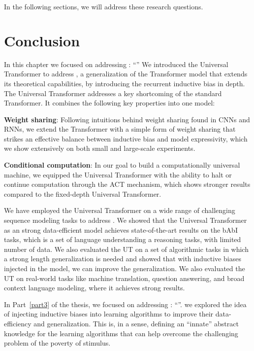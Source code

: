 In the following sections, we will address these research questions.




\section{Conclusion}
In this chapter we focused on addressing \textbf{}: ``\emph{}''
We introduced the Universal Transformer to address \textbf{}, a generalization of the Transformer model that extends its theoretical capabilities, by introducing the recurrent inductive bias in depth. 
The Universal Transformer addresses a key shortcoming of the standard Transformer. It combines the following key properties into one model:

\textbf{Weight sharing}: Following intuitions behind weight sharing found in CNNs and RNNs, we extend the Transformer with a simple form of weight sharing that strikes an effective balance between inductive bias and model expressivity, which we show extensively on both small and large-scale experiments.

\textbf{Conditional computation}: In our goal to build a computationally universal machine, we equipped the Universal Transformer with the ability to halt or continue computation through the ACT mechanism, which shows stronger results compared to the fixed-depth Universal Transformer.

We have employed the Universal Transformer on a wide range of challenging sequence modeling tasks to address \textbf{}. 
We showed that the Universal Transformer as an strong data-efficient model achieves state-of-the-art results on the bAbI tasks, which is a set of language understanding a reasoning tasks,  with limited number of data. We also evaluated the UT on a set of algorithmic tasks in which a strong length generalization is needed and showed that with inductive biases injected in the model, we can improve the generalization. We also evaluated the UT on real-world tasks like machine translation, question answering, and broad context language modeling, where it achieves strong results.


In Part~\ref{part3} of the thesis, we focused on addressing \textbf{}: ``\emph{}''.
we explored the idea of injecting inductive biases into learning algorithms to improve their data-efficiency and generalization. This is, in a sense, defining an ``innate'' abstract knowledge for the learning algorithms that can help overcome the challenging problem of the poverty of stimulus.

